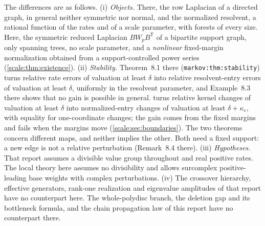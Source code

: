 \documentclass[11pt,a4paper]{article}
\numberwithin{equation}{section}
\theoremstyle{definition}
\begin{document}
The differences are as follows. (i) \emph{Objects.} There, the row Laplacian
of a directed graph, in general neither symmetric nor normal, and the
normalized resolvent, a rational function of the rates and of a scale
parameter, with forests of every size. Here, the symmetric reduced Laplacian
$BW_pB^{\mathsf T}$ of a bipartite support graph, only spanning trees, no
scale parameter, and a \emph{nonlinear} fixed-margin normalization obtained
from a support-controlled power series (\cref{scale:thm:existence}).
(ii) \emph{Stability.} Theorem~8.1 there (\nolinkurl{markov:thm:stability}) turns
relative rate errors of valuation at least $\delta$ into relative
resolvent-entry errors of valuation at least $\delta$, uniformly in the
resolvent parameter, and Example~8.3 there shows that no gain is possible in
general.  turns relative kernel changes of valuation at
least $\delta$ into normalized-entry changes of valuation at least
$\delta+\kappa_e$, with equality for one-coordinate changes; the gain comes
from the fixed margins and fails when the margins move
(\cref{scale:sec:boundaries}). The two theorems concern different maps, and
neither implies the other. Both need a fixed support: a new edge is not a
relative perturbation (Remark~8.4 there). (iii) \emph{Hypotheses.} That
report assumes a divisible value group throughout and real positive rates.
The local theory here assumes no divisibility and allows surcomplex
positive-leading base weights with complex perturbations. (iv) The
crossover hierarchy, effective generators, rank-one realization and
eigenvalue amplitudes of that report have no counterpart here. The whole-polydisc
branch, the deletion gap and its bottleneck formula, and the chain
propagation law of this report have no counterpart there.
\end{document}
